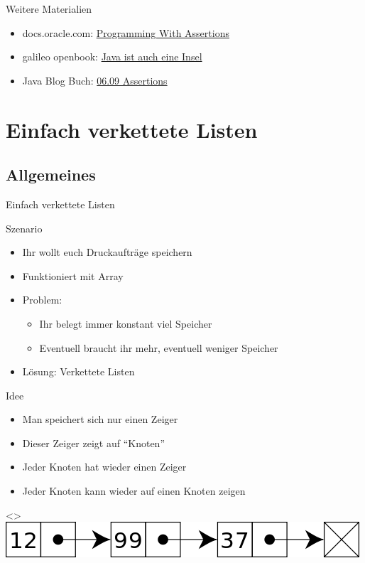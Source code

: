 \documentclass[usepdftitle=false,hyperref={pdfpagelabels=false}]{beamer}
\begin{document}
\begin{frame}{Weitere Materialien}
    \begin{itemize}
        \item docs.oracle.com: \href{http://docs.oracle.com/javase/1.4.2/docs/guide/lang/assert.html}{Programming With Assertions}
        \item galileo openbook: \href{http://openbook.galileodesign.de/javainsel5/javainsel07_005.htm}{Java ist auch eine Insel}
        \item Java Blog Buch: \href{http://www.java-blog-buch.de/0609-assertions/}{06.09 Assertions}
    \end{itemize}
\end{frame}

\section{Einfach verkettete Listen}
\subsection{Allgemeines}
\begin{frame}{Einfach verkettete Listen}
    \begin{block}{Szenario}
      \begin{itemize}[<+->]
        \item Ihr wollt euch Druckaufträge speichern
        \item Funktioniert mit Array
        \item Problem: 
          \begin{itemize}
            \item Ihr belegt immer konstant viel Speicher
            \item Eventuell braucht ihr mehr, eventuell weniger Speicher
          \end{itemize}
        \item Lösung: Verkettete Listen
      \end{itemize}
    \end{block}
\end{frame}

\begin{frame}{Idee}
    \begin{itemize}[<+->]
        \item Man speichert sich nur einen Zeiger
        \item Dieser Zeiger zeigt auf "`Knoten"'
        \item Jeder Knoten hat wieder einen Zeiger
        \item Jeder Knoten kann wieder auf einen Knoten zeigen
    \end{itemize}
    \only<\thebeamerpauses>{
        \includegraphics[width=\linewidth]{Singly-linked-list.png}
    }
\end{frame}
\end{document}
